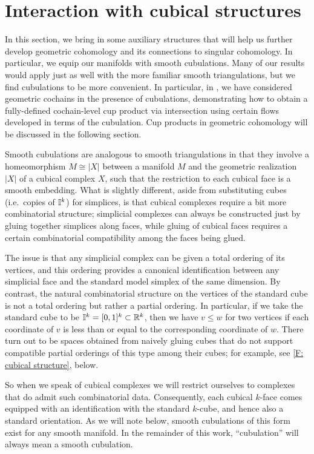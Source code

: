 
\section{Interaction with cubical structures}\label{S: transversality}

In this section, we bring in some auxiliary structures that will help us further develop geometric cohomology and its connections to singular cohomology.
In particular, we equip our manifolds with smooth cubulations.
Many of our results would apply just as well with the more familiar smooth triangulations, but we find cubulations to be more convenient.
In particular, in \cite{FMS-flows}, we have considered geometric cochains in the presence of cubulations, demonstrating how to obtain a fully-defined cochain-level cup product via intersection using certain flows developed in terms of the cubulation.
Cup products in geometric cohomology will be discussed in the following section.

Smooth cubulations are analogous to smooth triangulations in that they involve a homeomorphism $M \cong |X|$ between a manifold $M$ and the geometric realization $|X|$ of a cubical complex $X$, such that the restriction to each cubical face is a smooth embedding.
What is slightly different, aside from substituting cubes (i.e.\ copies of $\mathbb{I}^k$) for simplices, is that cubical complexes require a bit more combinatorial structure; simplicial complexes can always be constructed just by gluing together simplices along faces, while gluing of cubical faces requires a certain combinatorial compatibility among the faces being glued.

The issue is that any simplicial complex can be given a total ordering of its vertices, and this ordering provides a canonical identification between any simplicial face and the standard model simplex of the same dimension.
By contrast, the natural combinatorial structure on the vertices of the standard cube is not a total ordering but rather a partial ordering.
In particular, if we take the standard cube to be $\mathbb{I}^k = [0,1]^k \subset \mathbb{R}^k$, then we have $v \leq w$ for two vertices if each coordinate of $v$ is less than or equal to the corresponding coordinate of $w$.
There turn out to be spaces obtained from naively gluing cubes that do not support compatible partial orderings of this type among their cubes; for example, see \cref{F: cubical structure}, below.

So when we speak of cubical complexes we will restrict ourselves to complexes that do admit such combinatorial data.
Consequently, each cubical $k$-face comes equipped with an identification with the standard $k$-cube, and hence also a standard orientation.
As we will note below, smooth cubulations of this form exist for any smooth manifold.
In the remainder of this work, ``cubulation'' will always mean a smooth cubulation.

